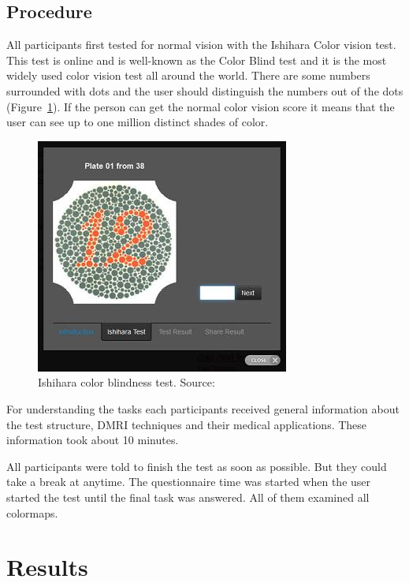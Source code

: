 \documentclass[a4paper, 12pt]{report}
\begin{document}
\begin{itemize}
\end{itemize}

\section{Procedure}
All participants first tested for normal vision with the Ishihara Color vision test. This test is online and is well-known as the Color Blind test and it is the most widely used color vision test all around the world. There are some numbers surrounded with dots and the user should distinguish the numbers out of the dots (Figure~\ref{fig:Ishihara}). If the person can get the normal color vision score it means that the user can see up to one million distinct shades of color.
\begin{figure}[ht]
    \centering
    \includegraphics[width = 0.6\columnwidth]{Ishihara}
    \caption{Ishihara color blindness test. Source:  \cite{www.color-blindness.com}}
    \label{fig:Ishihara}
\end{figure}

For understanding the tasks each participants received general information about the test structure, DMRI techniques and their medical applications. These information took about 10 minutes. 

All participants were told to finish the test as soon as possible. But they could take a break at anytime. The questionnaire time was started when the user started the test until the final task was answered. 
All of them examined all colormaps.

\chapter{Results}
\end{document}
